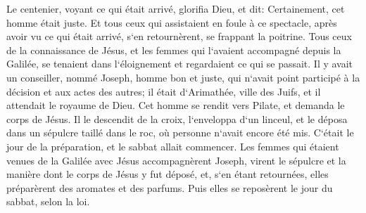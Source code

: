 \verse Le centenier, voyant ce qui était arrivé, glorifia Dieu, et dit: Certainement, cet homme était juste. 
\verse Et tous ceux qui assistaient en foule à ce spectacle, après avoir vu ce qui était arrivé, s`en retournèrent, se frappant la poitrine. 
\verse Tous ceux de la connaissance de Jésus, et les femmes qui l`avaient accompagné depuis la Galilée, se tenaient dans l`éloignement et regardaient ce qui se passait. 
\verse Il y avait un conseiller, nommé Joseph, homme bon et juste, 
\verse qui n`avait point participé à la décision et aux actes des autres; il était d`Arimathée, ville des Juifs, et il attendait le royaume de Dieu. 
\verse Cet homme se rendit vers Pilate, et demanda le corps de Jésus. 
\verse Il le descendit de la croix, l`enveloppa d`un linceul, et le déposa dans un sépulcre taillé dans le roc, où personne n`avait encore été mis. 
\verse C`était le jour de la préparation, et le sabbat allait commencer. 
\verse Les femmes qui étaient venues de la Galilée avec Jésus accompagnèrent Joseph, virent le sépulcre et la manière dont le corps de Jésus y fut déposé, 
\verse et, s`en étant retournées, elles préparèrent des aromates et des parfums. Puis elles se reposèrent le jour du sabbat, selon la loi. 


